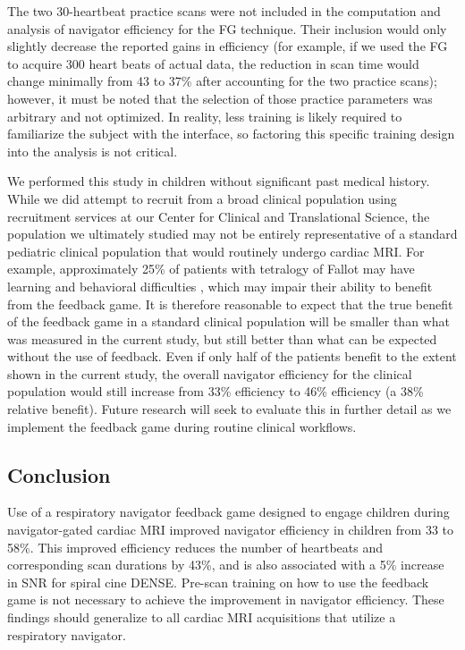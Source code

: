 		The two 30-heartbeat practice scans were not included in the computation and analysis of navigator efficiency for the FG technique. Their inclusion would only slightly decrease the reported gains in efficiency (for example, if we used the FG to acquire 300 heart beats of actual data, the reduction in scan time would change minimally from 43 to 37\% after accounting for the two practice scans); however, it must be noted that the selection of those practice parameters was arbitrary and not optimized. In reality, less training is likely required to familiarize the subject with the interface, so factoring this specific training design into the analysis is not critical.
		
		We performed this study in children without significant past medical history. While we did attempt to recruit from a broad clinical population using recruitment services at our Center for Clinical and Translational Science, the population we ultimately studied may not be entirely representative of a standard pediatric clinical population that would routinely undergo cardiac MRI. For example, approximately 25\% of patients with tetralogy of Fallot may have learning and behavioral difficulties \cite{Piran2011}, which may impair their ability to benefit from the feedback game. It is therefore reasonable to expect that the true benefit of the feedback game in a standard clinical population will be smaller than what was measured in the current study, but still better than what can be expected without the use of feedback. Even if only half of the patients benefit to the extent shown in the current study, the overall navigator efficiency for the clinical population would still increase from 33\% efficiency to 46\% efficiency (a 38\% relative benefit). Future research will seek to evaluate this in further detail as we implement the feedback game during routine clinical workflows.
		
	\subsection{Conclusion}
		Use of a respiratory navigator feedback game designed to engage children during navigator-gated cardiac MRI improved navigator efficiency in children from 33 to 58\%. This improved efficiency reduces the number of heartbeats and corresponding scan durations by 43\%, and is also associated with a 5\% increase in SNR for spiral cine DENSE. Pre-scan training on how to use the feedback game is not necessary to achieve the improvement in navigator efficiency. These findings should generalize to all cardiac MRI acquisitions that utilize a respiratory navigator.
